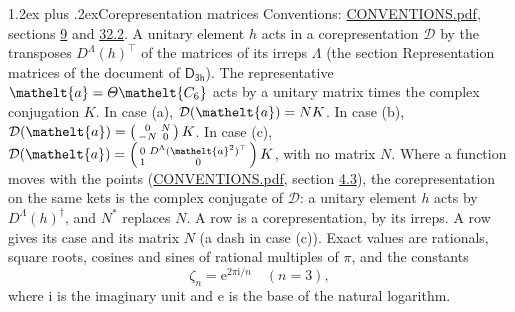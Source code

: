 \documentclass[10pt,a4paper]{article}
\makeatletter
\renewcommand\section{\@startsection{section}{1}{\z@}{-3ex plus -1ex minus -.2ex}%
  {1.2ex plus .2ex}{\normalfont\large\sffamily\bfseries\color{parttitle}}}
\numberwithin{equation}{section}
\newcommand{\eltfont}[1]{{\let\sigma\eltsigma\mathelt{#1}}}
\newcommand{\grp}[1]{\mathsf{#1}}
\newcommand{\elt}[1]{\eltfont{#1}}
\newcommand{\iunit}{\mathrm{i}}
\newcommand{\expe}{\mathrm{e}}
\newcommand{\rootunity}[1]{\zeta_{#1}}
\makeatother
\begin{document}
\section{Corepresentation matrices}\label{s:corep_matrices}
Conventions: \href{../../CONVENTIONS.pdf}{CONVENTIONS.pdf}, sections \href{../../../rotation/CONVENTIONS.pdf\#conv.9}{9} and \href{../../CONVENTIONS.pdf\#conv.32.2}{32.2}.
A unitary element $h$ acts in a corepresentation $\mathcal{D}$ by the transposes $D^{\Lambda}(h)^{\top}$ of the matrices of its irreps $\Lambda$ (the section Representation matrices of the document of \href{../../../rotation/data/pdf/D3h.pdf}{$\grp{D_{3h}}$}). The representative $\elt{a} = \varTheta\elt{C_{6}}$ acts by a unitary matrix times the complex conjugation $K$.
In case (a), $\mathcal{D}(\elt{a}) = NK$. In case (b), $\mathcal{D}(\elt{a}) = \left(\begin{smallmatrix} 0 & N \\ -N & 0 \end{smallmatrix}\right) K$. In case (c), $\mathcal{D}(\elt{a}) = \left(\begin{smallmatrix} 0 & D^{\Lambda}(\elt{a}^2)^{\top} \\ 1 & 0 \end{smallmatrix}\right) K$, with no matrix $N$.
Where a function moves with the points (\href{../../CONVENTIONS.pdf}{CONVENTIONS.pdf}, section \href{../../../rotation/CONVENTIONS.pdf\#conv.4.3}{4.3}), the corepresentation on the same kets is the complex conjugate of $\mathcal{D}$: a unitary element $h$ acts by $D^{\Lambda}(h)^{\dagger}$, and $N^{*}$ replaces $N$.
A row is a corepresentation, by its irreps. A row gives its case and its matrix $N$ (a dash in case (c)).
\leavevmode\label{n:constant.root}\label{n:index.root.order}Exact values are rationals, square roots, cosines and sines of rational multiples of $\pi$, and the constants
\begin{equation}\label{e:constants}\rootunity{n} = \expe^{2\pi\iunit/n}\quad(n = 3),\end{equation}
where $\iunit$ is the imaginary unit and $\expe$ is the base of the natural logarithm.
\end{document}
